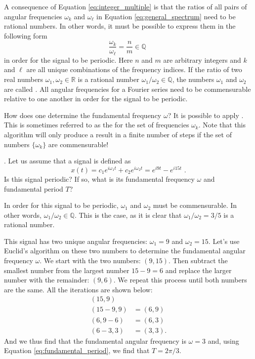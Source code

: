 A consequence of Equation \ref{eq:integer_multiple} is that the ratios
of all pairs of angular frequencies $\omega_k$ and $\omega_{\ell}$ in
Equation \ref{eq:general_spectrum} need to be rational numbers. In
other words, it must be possible to express them in the following form
\begin{equation}
  \frac{\omega_k}{\omega_{\ell}} = \frac{n}{m} \in \mathbb{Q} \,\,
\end{equation}
in order for the signal to be periodic. Here $n$ and $m$ are arbitrary
integers and $k$ and $\ell$ are all unique combinations of the
frequency indices.  If the ratio of two real numbers
$\omega_1,\omega_2\in\mathbb{R}$ is a rational number
$\omega_1/\omega_2 \in \mathbb{Q}$, the numbers $\omega_1$ and
$\omega_2$ are called \emph{.}
All angular frequencies for a Fourier series need to be commensurable
relative to one another in order for the signal to be periodic.

How does one determine the fundamental frequency $\omega$? It is
possible to apply \emph{}. This is sometimes referred to as
the \emph{}
for the set of frequencies $\omega_k$. Note that this algorithm will
only produce a result in a finite number of steps if the set of
numbers $\{\omega_k\}$ are commensurable!

. Let us assume that a signal is defined as
\begin{equation}
  x(t) = c_1 e^{i \omega_1 t} + c_2 e^{i \omega_2 t} = e^{i9t} - e^{i15t} \,\,.
\end{equation}
Is this signal periodic? If so, what is its fundamental frequency
$\omega$ and fundamental period $T$?

In order for this signal to be periodic, $\omega_1$ and $\omega_2$
must be commensurable.  In other words,
$\omega_1/\omega_2 \in \mathbb{Q}$. This is the case, as it is clear
that $\omega_1/\omega_2 = 3/5$ is a rational number.

This signal has two unique angular frequencies: $\omega_1 = 9$
and $\omega_2 = 15$.  Let's use Euclid's algorithm on these two numbers to determine
the fundamental angular frequency $\omega$.  We start with the two
numbers: $(9,15)$. Then subtract the smallest number from
the largest number $15-9=6$ and replace the larger
number with the remainder: $(9,6)$.  We repeat this process
until both numbers are the same.  All the iterations are shown below:
\begin{align*}
  (15,9)     &         \\
  (15-9,9)   & = (6,9) \\
  (6,9-6)    & = (6,3) \\
  (6-3,3)    & = (3,3).
\end{align*}
And we thus find that the fundamental angular frequency is $\omega=3$ and, using
Equation \ref{eq:fundamental_period}, we find that $T = 2\pi/3$.

